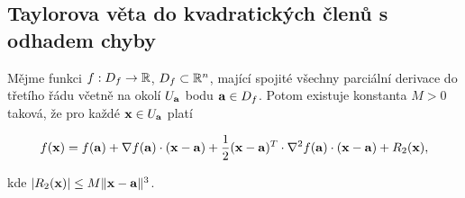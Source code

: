 \subsection*{Taylorova věta do kvadratických členů s odhadem chyby}

Mějme funkci $f: D_f \to \mathbb{R}$, $D_f \subset \mathbb{R}^n$, mající spojité všechny
parciální derivace do třetího řádu včetně na okolí $U_{\mathbf{a}}$ bodu $\mathbf{a} \in D_f$.
Potom existuje konstanta $M > 0$ taková, že pro každé $\mathbf{x} \in U_{\mathbf{a}}$ platí

\[ f(\mathbf{x}) = f(\mathbf{a}) + \nabla f(\mathbf{a}) \cdot (\mathbf{x} - \mathbf{a}) + \frac{1}{2} (\mathbf{x} - \mathbf{a})^T \cdot \nabla^2 f(\mathbf{a}) \cdot (\mathbf{x} - \mathbf{a}) + R_2(\mathbf{x}), \]

\noindent kde $|R_2(\mathbf{x})| \leq M \|\mathbf{x} - \mathbf{a}\|^3$.

\pagebreak
